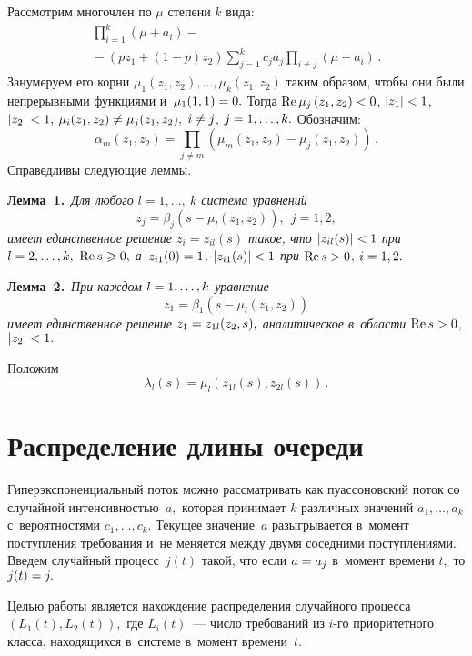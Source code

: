 \begin{multicols}{2}
  Рассмотрим многочлен по $\mu$ степени $k$ вида:
\begin{multline}
\label{1}
\prod\limits_{i=1}^k\left(\mu+a_i\right)-{}\\
{}-
\left(pz_1+(1-p)z_2\right)\sum\limits_{j=1}^kc_ja_j\prod\limits_{i\ne
j}\left(\mu+a_i\right)\,.
\end{multline}
Занумеруем его корни $\mu_1(z_1,z_2),\ldots,\mu_k(z_1,z_2)$ таким образом,
чтобы они были непрерывными функциями и~$\mu_1(1,1)\hm=0.$ Тогда
$\mathrm{Re}\, \mu_j\left(z_1,z_2\right)\hm<0$, $|z_1|\hm<1$, 
$|z_2|\hm<1,$ $\mu_i(z_1,z_2)\hm\ne \mu_j(z_1,z_2),$ $ i\hm\ne j$,
$j\hm=1,\ldots,k.$ Обозначим:
$$
\alpha_m(z_1,z_2)=\prod\limits_{j\ne m}\left(\mu_m\left(z_1,z_2\right)-
\mu_j\left(z_1,z_2\right)\right)\,.
$$
Справедливы следующие леммы.

\smallskip

\noindent
\textbf{Лемма~1.}\
\textit{Для любого $l=1,\ldots,\:k$ система уравнений}
$$
z_j=\beta_j(s-\mu_l(z_1,z_2)),\ \ j=1,2,
$$
\textit{имеет единственное решение $z_i=z_{il}(s)$ такое, 
что $|z_{il}(s)|\hm<1$ при $l\hm=2,\ldots, k,$ $\mathrm{Re}\, s\hm\geqslant 0,$ 
а~$z_{i1}(0)\hm=1$, $|z_{i1}(s)|\hm<1$ при} $\mathrm{Re}\, s\hm> 0$, $i\hm=1,2.$

\smallskip

\noindent
\textbf{Лемма~2.}\
\textit{При каждом $l\hm=1,\ldots,k$ уравнение}
$$
z_1=\beta_1\left(s-\mu_l(z_1,z_2)\right)
$$
\textit{имеет единственное решение $z_1\hm=z_{1l}(z_2,s),$ 
аналитическое в~области $\mathrm{Re}\, s\hm>0$, $|z_2|\hm<1.$
}

\smallskip

Положим
$$
\lambda_l(s)=\mu_l\left(z_{1l}(s),z_{2l}(s)\right)\,.
$$




\section{Распределение длины очереди}

  Гиперэкспоненциальный поток можно рас\-смат\-ри\-вать как
пуассоновский поток со случайной интен\-сив\-ностью~$a,$ которая
принимает $k$ различных значений $a_1,\ldots,a_k$  с~вероятностями
$c_1,\ldots,c_k.$ Текущее значение~$a$ разыгрывается в~момент
поступления требования и~не меняется между двумя соседними
поступлениями. Введем случайный процесс~$j(t)$ такой, что если
$a\hm=a_j$ в~момент времени $t,$ то $j(t)\hm=j.$

Целью работы является нахождение распределения случайного процесса
$\left(L_1(t),L_2(t)\right),$ где $L_i(t)$~--- число требований из
$i$-го приоритетного класса, находящихся в~системе в~момент
времени~$t.$


\end{multicols}

